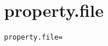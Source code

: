 \section{property.file}
\label{configuration:PropertyFile}
\AvailableInCsharpOnly{\TODO}
\begin{lstlisting}[style=Props,caption={Usage example for \textit{property.file}}]
property.file=
\end{lstlisting}